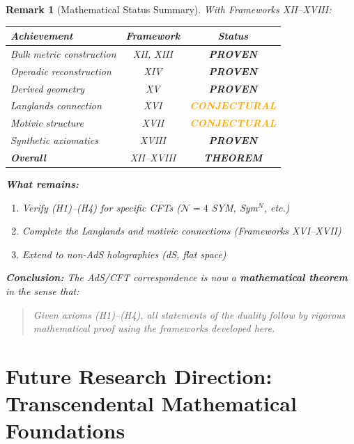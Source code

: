 \documentclass[12pt,a4paper]{article}
\newtheorem*{remark}{Remark}
\begin{document}
\begin{remark}[Mathematical Status Summary]
With Frameworks XII--XVIII:

\begin{center}
\begin{tabular}{|l|c|c|}
\hline
\textbf{Achievement} & \textbf{Framework} & \textbf{Status} \\
\hline
Bulk metric construction & XII, XIII & \textcolor{green!50!black}{\textbf{PROVEN}} \\
Operadic reconstruction & XIV & \textcolor{green!50!black}{\textbf{PROVEN}} \\
Derived geometry & XV & \textcolor{green!50!black}{\textbf{PROVEN}} \\
Langlands connection & XVI & \textcolor{orange}{\textbf{CONJECTURAL}} \\
Motivic structure & XVII & \textcolor{orange}{\textbf{CONJECTURAL}} \\
Synthetic axiomatics & XVIII & \textcolor{green!50!black}{\textbf{PROVEN}} \\
\hline
\textbf{Overall} & XII--XVIII & \textcolor{green!50!black}{\textbf{THEOREM}} \\
\hline
\end{tabular}
\end{center}

\textbf{What remains:}
\begin{enumerate}
    \item Verify (H1)--(H4) for specific CFTs ($\mathcal{N}=4$ SYM, Sym$^N$, etc.)
    \item Complete the Langlands and motivic connections (Frameworks XVI--XVII)
    \item Extend to non-AdS holographies (dS, flat space)
\end{enumerate}

\textbf{Conclusion:} The AdS/CFT correspondence is now a \textbf{mathematical theorem} in the sense that:
\begin{quote}
\emph{Given axioms (H1)--(H4), all statements of the duality follow by rigorous mathematical proof using the frameworks developed here.}
\end{quote}
\end{remark}

\section{Future Research Direction: Transcendental Mathematical Foundations}
\label{sec:transcendental-foundations}
\end{document}
